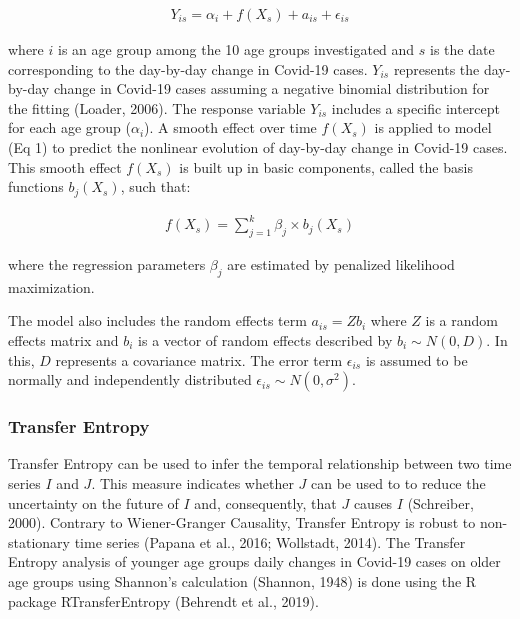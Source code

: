 \documentclass[]{elsarticle} %
\begin{document}
\begin{align}
Y_{is} = \alpha_{i} + f(X_{s}) + a_{is} + \epsilon_{is}
\end{align}

\noindent where \(i\) is an age group among the 10 age groups investigated and \(s\) is the date corresponding to the day-by-day change in Covid-19 cases. \(Y_{is}\) represents the day-by-day change in Covid-19 cases assuming a negative binomial distribution for the fitting (Loader, 2006). The response variable \(Y_{is}\) includes a specific intercept for each age group (\(\alpha_{i}\)). A smooth effect over time \(f(X_{s})\) is applied to model (Eq 1) to predict the nonlinear evolution of day-by-day change in Covid-19 cases. This smooth effect \(f(X_{s})\) is built up in basic components, called the basis functions \(b_{j}(X_{s})\), such that:

\begin{align}
f(X_{s})=\sum_{j=1}^{k}\beta_{j}\times b_{j}(X_{s})
\end{align}

\noindent where the regression parameters \(\beta_{j}\) are estimated by penalized likelihood maximization.

The model also includes the random effects term \(a_{is}= Zb_{i}\) where \(Z\) is a random effects matrix and \(b_{i}\) is a vector of random effects described by \(b_{i} \sim N(0, D)\). In this, \(D\) represents a covariance matrix. The error term \(\epsilon_{is}\) is assumed to be normally and independently distributed \(\epsilon_{is} \sim N(0, \sigma^2)\).

\hypertarget{transfer-entropy}{%
\subsubsection{Transfer Entropy}\label{transfer-entropy}}

Transfer Entropy can be used to infer the temporal relationship between two time series \(I\) and \(J\). This measure indicates whether \(J\) can be used to to reduce the uncertainty on the future of \(I\) and, consequently, that \(J\) causes \(I\) (Schreiber, 2000). Contrary to Wiener-Granger Causality, Transfer Entropy is robust to non-stationary time series (Papana et al., 2016; Wollstadt, 2014). The Transfer Entropy analysis of younger age groups daily changes in Covid-19 cases on older age groups using Shannon's calculation (Shannon, 1948) is done using the R package RTransferEntropy (Behrendt et al., 2019).
\end{document}
